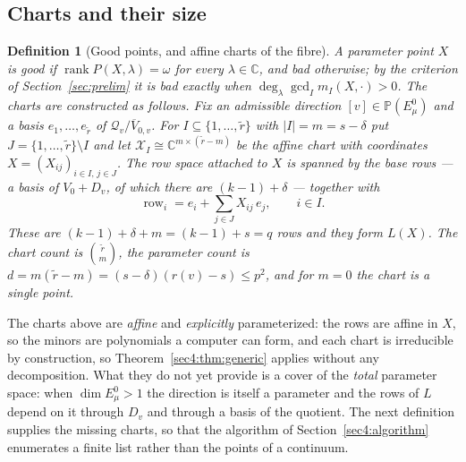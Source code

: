\documentclass[journal]{IEEEtran}
\theoremstyle{plainn}
\newtheorem{defn}[thm]{Definition}
\theoremstyle{remark}
\newcommand{\row}{\operatorname{row}}
\newcommand{\rank}{\operatorname{rank}}
\begin{document}
\subsection{Charts and their size}
\label{sec4:charts}

\begin{defn}[Good points, and affine charts of the fibre]
\label{sec4:defn:goodbad}
\label{sec4:defn:charts}
A parameter point $X$ is \emph{good} if $\rank P(X,\lambda)=\omega$ for every $\lambda\in\mathbb C$,
and \emph{bad} otherwise; by the criterion of Section~\ref{sec:prelim} it is bad exactly when
$\deg_\lambda\gcd_I m_I(X,\cdot)>0$. The charts are constructed as follows. Fix an admissible direction
$[v]\in\mathbb P(E_\mu^0)$ and a basis $e_1,\dots,e_{\widetilde r}$ of
$\mathcal Q_v/\overline V_{0,v}$. For $I\subseteq\{1,\dots,\widetilde r\}$ with $|I|=m=s-\delta$ put
$J=\{1,\dots,\widetilde r\}\setminus I$ and let
$\mathcal X_I\cong\mathbb C^{m\times(\widetilde r-m)}$ be the affine chart with coordinates
$X=(X_{ij})_{i\in I,\,j\in J}$. The row space attached to $X$ is spanned by the base rows --- a basis
of $V_0+D_v$, of which there are $(k-1)+\delta$ --- together with
\[
\row_i=e_i+\sum_{j\in J}X_{ij}\,e_j,\qquad i\in I .
\]
These are $(k-1)+\delta+m=(k-1)+s=q$ rows and they form $L(X)$. The chart count is
$\binom{\widetilde r}{m}$, the parameter count is
$d=m(\widetilde r-m)=(s-\delta)(r(v)-s)\le p^2$, and for $m=0$ the chart is a single point.
\end{defn}

The charts above are \emph{affine} and \emph{explicitly} parameterized: the rows are affine in $X$, so
the minors are polynomials a computer can form, and each chart is irreducible by construction, so
Theorem~\ref{sec4:thm:generic} applies without any decomposition. What they do not yet provide is a
cover of the \emph{total} parameter space: when $\dim E_\mu^0>1$ the direction is itself a parameter and
the rows of $L$ depend on it through $D_v$ and through a basis of the quotient. The next definition
supplies the missing charts, so that the algorithm of Section~\ref{sec4:algorithm} enumerates a finite
list rather than the points of a continuum.
\end{document}
